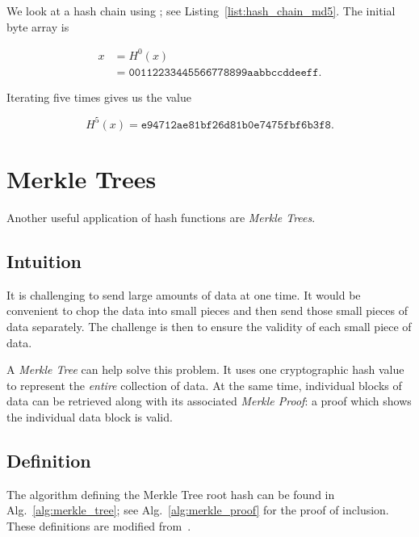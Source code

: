 \begin{example}

We look at a hash chain using \MDFive{};
see Listing~\ref{list:hash_chain_md5}.
The initial byte array is

\begin{align}
    x &= H^{0}(x) \nonumber\\
        &= \texttt{00112233445566778899aabbccddeeff}.
\end{align}



\noindent
Iterating \MDFive{} five times gives us the value

\begin{equation}
    H^{5}(x) = \texttt{e94712ae81bf26d81b0e7475fbf6b3f8}.
\end{equation}
\end{example}



\section{Merkle Trees}

Another useful application of \glspl{hash function} are \emph{Merkle Trees}.

\subsection{Intuition}

It is challenging to send large amounts of data at one time.
It would be convenient to chop the data into small pieces
and then send those small pieces of data separately.
The challenge is then to ensure the validity of each small
piece of data.

A \emph{Merkle Tree} can help solve this problem.
It uses one cryptographic hash value to represent the \emph{entire}
collection of data.
At the same time, individual blocks of data can be retrieved
along with its associated \emph{Merkle Proof}:
a proof which shows the individual data block is valid.

\subsection{Definition}

The algorithm defining the Merkle Tree root hash can be found in
Alg.~\ref{alg:merkle_tree};
see Alg.~\ref{alg:merkle_proof} for the proof of inclusion.
These definitions are modified
from~\cite[Chapter 8.9]{BonehShoupGraduateApplied}.

